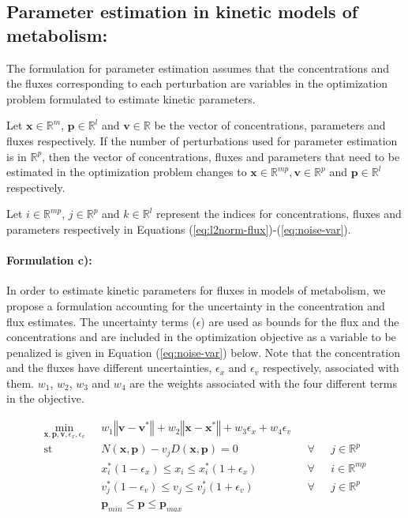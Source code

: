 \documentclass[10pt]{article}
\begin{document}
	\subsection{Parameter estimation in kinetic models of metabolism:}
	The formulation for parameter estimation assumes that the concentrations and the fluxes corresponding to each perturbation are variables in the optimization problem formulated to estimate kinetic parameters.
	
	Let $\mathbf{x}\in\mathbb{R}^m$, $\mathbf{p}\in\mathbb{R}^l$ and $\mathbf{v}\in\mathbb{R}$ be the vector of concentrations, parameters and fluxes respectively. If the number of perturbations used for parameter estimation is in $\mathbb{R}^p$, then the vector of concentrations, fluxes and parameters that need to be estimated in the optimization problem changes to $\mathbf{x}\in\mathbb{R}^{mp}, \mathbf{v}\in\mathbb{R}^{p}$ and $\mathbf{p}\in\mathbb{R}^{l}$ respectively. 
	
	Let $i\in\mathbb{R}^{mp}$, $j\in\mathbb{R}^{p}$ and $k\in\mathbb{R}^{l}$ represent the indices for concentrations, fluxes and parameters respectively in Equations (\ref{eq:l2norm-flux})-(\ref{eq:noise-var}).
	
	\paragraph{Formulation c):}
	In order to estimate kinetic parameters for fluxes in models of metabolism, we propose a formulation accounting for the uncertainty in the concentration and flux estimates. The uncertainty terms ($\epsilon$) are used as bounds for the flux and the concentrations and are included in the optimization objective as a variable to be penalized is given in Equation (\ref{eq:noise-var}) below. Note that the concentration and the fluxes have different uncertainties, $\epsilon_x$ and $\epsilon_v$ respectively, associated with them. $w_1$, $w_2$, $w_3$ and $w_4$ are the weights associated with the four different terms in the objective. 
	\begin{center}
		\begin{subequations}\label{eq:noise-var}
			\begin{align}
			\underset{\mathbf{x},\mathbf{p},\mathbf{v},\epsilon_x,\epsilon_v}{\mathrm{min}} & \text{      }w_1\left\Vert \mathbf{v}-\mathbf{v}^*\right\Vert + w_2\left\Vert \mathbf{x}-\mathbf{x}^*\right\Vert + w_3\epsilon_x + w_4\epsilon_v\\
			\mathrm{st}& \text{      }N(\mathbf{x},\mathbf{p}) - v_jD(\mathbf{x},\mathbf{p}) = 0 & \text{  }\forall & \text{ }j\in\mathbb{R}^p\\
			& \text{      }x^*_i(1-\epsilon_x)\le x_i \le x^*_i(1+\epsilon_x) & \text{  }\forall & \text{ }i\in\mathbb{R}^{mp}\\	
			& \text{      }v^*_j(1-\epsilon_v)\le v_j \le v^*_j(1+\epsilon_v) & \text{  }\forall & \text{ }j\in\mathbb{R}^{p}\\		
			& \text{      }\mathbf{p}_{min} \le \mathbf{p} \le \mathbf{p}_{max}
			\end{align}
		\end{subequations}
	\end{center}
	
\end{document}
